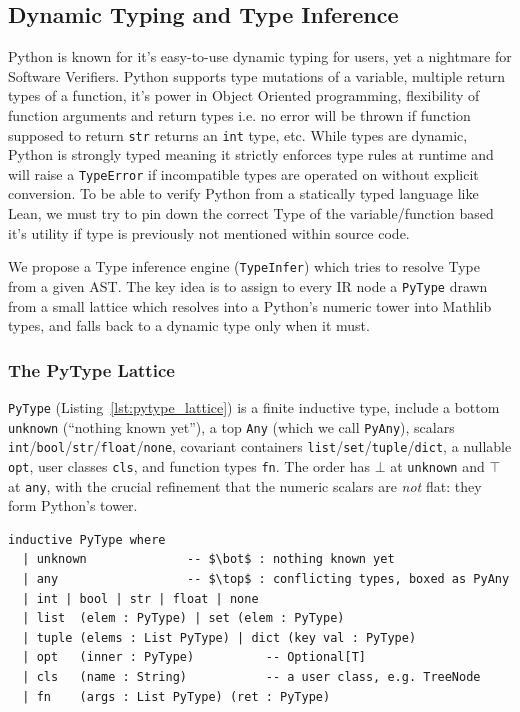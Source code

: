 \documentclass{article}
\newcommand{\code}{\lstinline}
\begin{document}
{\subsection{Dynamic Typing and Type Inference}
\label{sec:typeinfer}

Python is known for it's easy-to-use dynamic typing for users, yet a nightmare for Software Verifiers. Python supports type mutations of a variable, multiple return types of a function, it's power in Object Oriented programming, flexibility of function arguments and return types i.e. no error will be thrown if function supposed to return \code{str} returns an \code{int} type, etc. While types are dynamic, Python is strongly typed meaning it strictly enforces type rules at runtime and will raise a \code{TypeError} if incompatible types are operated on without explicit conversion. To be able to verify Python from a statically typed language like Lean, we must try to pin down the correct Type of the variable/function based it's utility if type is previously not mentioned within source code.

We propose a Type inference engine (\code{TypeInfer}) which tries to resolve Type from a given AST. The key idea is to assign to every IR node a \code{PyType} drawn from a small lattice which resolves into a Python's numeric tower into Mathlib types, and falls back to a dynamic type only when it must.

\subsubsection{The PyType Lattice}
\code{PyType} (Listing~\ref{lst:pytype_lattice}) is a finite inductive type, include a bottom \code{unknown} (``nothing known yet''), a top \code{Any} (which we call
\code{PyAny}), scalars \code{int}/\code{bool}/\code{str}/\code{float}/\code{none}, covariant
containers \code{list}/\code{set}/\code{tuple}/\code{dict}, a nullable \code{opt}, user classes
\code{cls}, and function types \code{fn}. The order has $\bot$ at \code{unknown} and
$\top$ at \code{any}, with the crucial refinement that the numeric scalars are \emph{not} flat:
they form Python's tower.

\begin{lstlisting}[caption={The \texttt{PyType} lattice.},label={lst:pytype_lattice}, mathescape=true]
inductive PyType where
  | unknown              -- $\bot$ : nothing known yet
  | any                  -- $\top$ : conflicting types, boxed as PyAny
  | int | bool | str | float | none
  | list  (elem : PyType) | set (elem : PyType)
  | tuple (elems : List PyType) | dict (key val : PyType)
  | opt   (inner : PyType)          -- Optional[T]
  | cls   (name : String)           -- a user class, e.g. TreeNode
  | fn    (args : List PyType) (ret : PyType)
\end{lstlisting}

}
\end{document}
